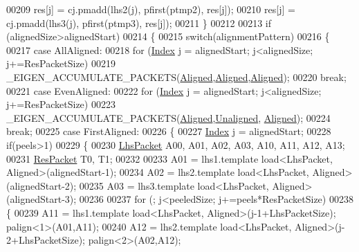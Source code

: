 \begin{DoxyCode}
{00209         res[j] = cj.pmadd(lhs2(j), pfirst(ptmp2), res[j]);
00210         res[j] = cj.pmadd(lhs3(j), pfirst(ptmp3), res[j]);
00211       \}
00212 
00213       \textcolor{keywordflow}{if} (alignedSize>alignedStart)
00214       \{
00215         \textcolor{keywordflow}{switch}(alignmentPattern)
00216         \{
00217           \textcolor{keywordflow}{case} AllAligned:
00218             \textcolor{keywordflow}{for} (\hyperlink{namespace_eigen_a62e77e0933482dafde8fe197d9a2cfde}{Index} j = alignedStart; j<alignedSize; j+=ResPacketSize)
00219               \_EIGEN\_ACCUMULATE\_PACKETS(\hyperlink{group__enums_gga45fe06e29902b7a2773de05ba27b47a1ad37d4c71425bb286e9b4103830538fbf}{Aligned},\hyperlink{group__enums_gga45fe06e29902b7a2773de05ba27b47a1ad37d4c71425bb286e9b4103830538fbf}{Aligned},\hyperlink{group__enums_gga45fe06e29902b7a2773de05ba27b47a1ad37d4c71425bb286e9b4103830538fbf}{Aligned});
00220             \textcolor{keywordflow}{break};
00221           \textcolor{keywordflow}{case} EvenAligned:
00222             \textcolor{keywordflow}{for} (\hyperlink{namespace_eigen_a62e77e0933482dafde8fe197d9a2cfde}{Index} j = alignedStart; j<alignedSize; j+=ResPacketSize)
00223               \_EIGEN\_ACCUMULATE\_PACKETS(\hyperlink{group__enums_gga45fe06e29902b7a2773de05ba27b47a1ad37d4c71425bb286e9b4103830538fbf}{Aligned},\hyperlink{group__enums_gga45fe06e29902b7a2773de05ba27b47a1ac935220b4c844108e183ebe30a4d5204}{Unaligned},
      \hyperlink{group__enums_gga45fe06e29902b7a2773de05ba27b47a1ad37d4c71425bb286e9b4103830538fbf}{Aligned});
00224             \textcolor{keywordflow}{break};
00225           \textcolor{keywordflow}{case} FirstAligned:
00226           \{
00227             \hyperlink{namespace_eigen_a62e77e0933482dafde8fe197d9a2cfde}{Index} j = alignedStart;
00228             \textcolor{keywordflow}{if}(peels>1)
00229             \{
00230               \hyperlink{class_eigen_1_1internal_1_1_tensor_lazy_evaluator_writable}{LhsPacket} A00, A01, A02, A03, A10, A11, A12, A13;
00231               \hyperlink{class_eigen_1_1internal_1_1_tensor_lazy_evaluator_writable}{ResPacket} T0, T1;
00232 
00233               A01 = lhs1.template load<LhsPacket, Aligned>(alignedStart-1);
00234               A02 = lhs2.template load<LhsPacket, Aligned>(alignedStart-2);
00235               A03 = lhs3.template load<LhsPacket, Aligned>(alignedStart-3);
00236 
00237               \textcolor{keywordflow}{for} (; j<peeledSize; j+=peels*ResPacketSize)
00238               \{
00239                 A11 = lhs1.template load<LhsPacket, Aligned>(j-1+LhsPacketSize);  palign<1>(A01,A11);
00240                 A12 = lhs2.template load<LhsPacket, Aligned>(j-2+LhsPacketSize);  palign<2>(A02,A12);
}
\end{DoxyCode}
